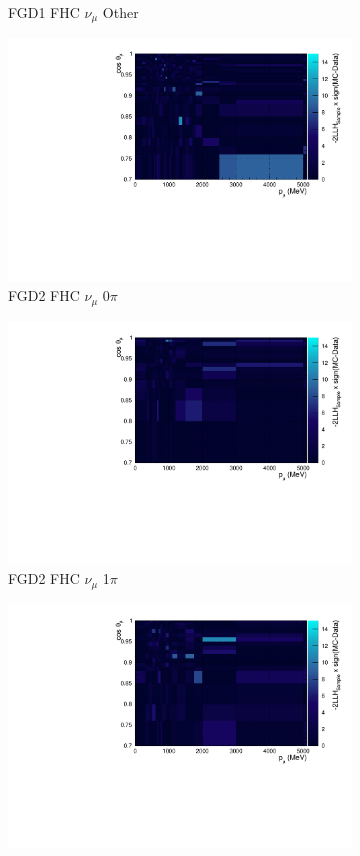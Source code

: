 \begin{figure}
\begin{subfigure}{.32\textwidth}
  \caption{FGD1 FHC $\nu_{\mu}$ Other}
  \label{fig:llhcont_FGD1_numuCC_other}
\end{subfigure}
\centering
\begin{subfigure}{.32\textwidth}
  \centering
  \includegraphics[width=0.85\linewidth]{figs/llhcont_FGD2_numuCC_0pi.pdf}
  \caption{FGD2 FHC $\nu_{\mu}$ 0$\pi$}
  \label{fig:llhcont_FGD2_numuCC_0pi}
\end{subfigure}
\begin{subfigure}{.32\textwidth}
  \centering
  \includegraphics[width=0.85\linewidth]{figs/llhcont_FGD2_numuCC_1pi.pdf}
  \caption{FGD2 FHC $\nu_{\mu}$ 1$\pi$}
  \label{fig:llhcont_FGD2_numuCC_1pi}
\end{subfigure}
\begin{subfigure}{.32\textwidth}
  \centering
  \includegraphics[width=0.85\linewidth]{figs/llhcont_FGD2_numuCC_other.pdf}

\end{subfigure}
\end{figure}
